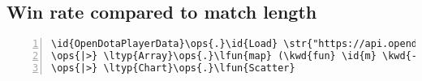 \documentclass{article}
\newcommand{\id}[1]{\textcolor{black}{#1}}
\newcommand{\kwd}[1]{\textcolor{navy}{#1}}
\newcommand{\num}[1]{\textcolor{officegreen}{#1}}
\newcommand{\ops}[1]{\textcolor{purple}{#1}}
\newcommand{\str}[1]{\textcolor{olive}{#1}}
\begin{document}
\subsection*{Win rate compared to match length}

\begin{Verbatim}[commandchars=\\\{\}, numbers=left]
\id{OpenDotaPlayerData}\ops{.}\id{Load} \str{"https://api.opendota.com/api/players/71050296/matches"}
\ops{|>} \ltyp{Array}\ops{.}\lfun{map} (\kwd{fun} \id{m} \kwd{->} \id{m}\ops{.}\id{Duration},\kwd{if} \id{m}\ops{.}\id{Deaths} \ops{>} \num{0} \kwd{then} (\id{m}\ops{.}\id{Kills} \ops{|>} \lfun{double}) \ops{/} (\id{m}\ops{.}\id{Deaths}\ops{|>} \lfun{double}) \kwd{else} \id{m}\ops{.}\id{Kills} \ops{|>} \lfun{double})
\ops{|>} \ltyp{Chart}\ops{.}\lfun{Scatter}
\end{Verbatim}
\end{document}
